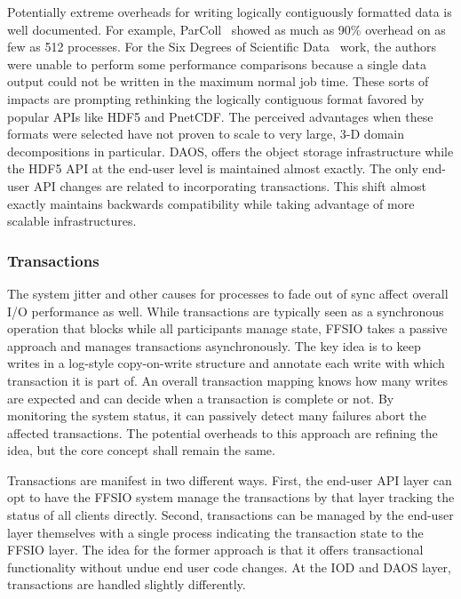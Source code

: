 Potentially extreme overheads for writing logically contiguously formatted data
is well documented. For example, ParColl~\cite{yu:2008:parcoll} showed as much
as 90\% overhead on as few as 512 processes. For the Six Degrees of Scientific
Data~\cite{lofstead:2011:six-degrees} work, the authors were unable to perform
some performance comparisons because a single data output could not be written
in the maximum normal job time. These sorts of impacts are prompting rethinking
the logically contiguous format favored by popular APIs like HDF5 and PnetCDF.
The perceived advantages when these formats were selected have not proven to
scale to very large, 3-D domain decompositions in particular. DAOS, offers the
object storage infrastructure while the HDF5 API at the end-user level is
maintained almost exactly. The only end-user API changes are related to
incorporating transactions. This shift almost exactly maintains backwards
compatibility while taking advantage of more scalable infrastructures.

\subsubsection{Transactions}
The system jitter and other causes for processes to fade out of sync affect
overall I/O performance as well. While transactions are typically seen as a
synchronous operation that blocks while all participants manage state, FFSIO
takes a passive approach and manages transactions asynchronously. The key idea
is to keep writes in a log-style copy-on-write structure and annotate each
write with which transaction it is part of. An overall transaction mapping
knows how many writes are expected and can decide when a transaction is
complete or not. By monitoring the system status, it can passively detect many
failures abort the affected transactions. The potential overheads to this
approach are refining the idea, but the core concept shall remain the same.

Transactions are manifest in two different ways. First, the end-user API layer
can opt to have the FFSIO system manage the transactions by that layer
tracking the status of all clients directly. Second, transactions can be
managed by the end-user layer themselves with a single process indicating the
transaction state to the FFSIO layer. The idea for the former approach is that
it offers transactional functionality without undue end user code changes. At
the IOD and DAOS layer, transactions are handled slightly differently.

